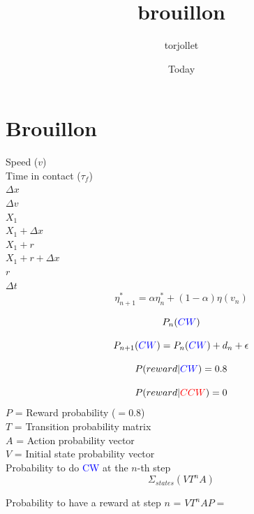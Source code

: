 \documentclass{article}
\title{brouillon}
\author{torjollet }
\date{Today}
\begin{document}
\maketitle

\section{Brouillon}


Speed ($v$)\\
Time in contact ($\tau_f$)\\
$\Delta x$\\
$\Delta v$\\
$X_1$\\
$X_1+\Delta x$\\
$X_1+r$\\
$X_1+r+\Delta x$\\
$r$\\
$\Delta t$\\

$$
    \eta^*_{n+1} = \alpha \eta^*_{n} + (1-\alpha)\eta(v_n)
$$

$$
P_n(\textcolor{blue}{CW})
$$

$$
P_{n+1}(\textcolor{blue}{CW}) = P_n(\textcolor{blue}{CW}) + d_n + \epsilon
$$

$$
P(reward| \textcolor{blue}{CW}) = 0.8
$$

$$
P(reward| \textcolor{red}{CCW}) = 0
$$
$P$ = Reward probability ($=0.8$) \\
$T$ = Transition probability matrix \\
$A$ = Action probability vector \\
$V$ = Initial state probability vector\\ 
Probability to do \textcolor{blue}{CW} at the $n$-th step \\
$$
    \Sigma_{states}(VT^nA)
$$

Probability to have a reward at step $n$ = $VT^nAP=$
\end{document}
